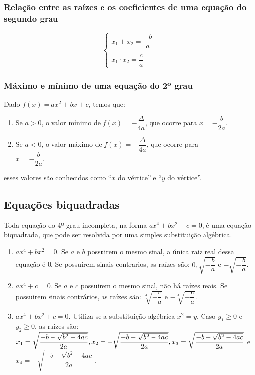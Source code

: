 \documentclass{article}
\begin{document}
\subsubsection{Relação entre as raízes e os coeficientes de uma equação do segundo grau}
\begin{equation*}
    \begin{cases}
        x_1+x_2=\dfrac{-b}{a}\\ \\
        x_1\cdot x_2=\dfrac{c}{a}
    \end{cases}
\end{equation*}

\subsubsection{Máximo e mínimo de uma equação do 2º grau}
Dado $f(x)=ax^2+bx+c$, temos que:
\begin{enumerate}
    \item Se $a>0$, o valor mínimo de $f(x)=-\dfrac{\Delta}{4a}$, que ocorre para $x=-\dfrac{b}{2a}$.
    \item Se $a<0$, o valor máximo de $f(x)=-\dfrac{\Delta}{4a}$, que ocorre para \\$x=-\dfrac{b}{2a}$.
\end{enumerate}
esses valores são conhecidos como ``$x$ do vértice'' e ``$y$ do vértice''.

\subsection{Equações biquadradas}
Toda equação do 4º grau incompleta, na forma $ax^4+bx^2+c=0$, é uma equação biquadrada, que pode ser resolvida por uma simples substituição algébrica.
\begin{enumerate}
        \item $ax^4+bx^2=0$. Se $a$ e $b$ possuirem o mesmo sinal, a única raiz real dessa equação é 0. Se possuirem sinais contrarios, as raízes são: $0, \sqrt{-\dfrac{b}{a}}$ e $-\sqrt{-\dfrac{b}{a}}$.
        \item $ax^4+c=0$. Se $a$ e $c$ possuirem o mesmo sinal, não há raízes reais. Se possuirem sinais contrários, as raízes são: $\sqrt[4]{-\dfrac{c}{a}}$ e $-\sqrt[4]{-\dfrac{c}{a}}$.
        \item $ax^4+bx^2+c=0$. Utiliza-se a substituição algébrica $x^2=y$. Caso $y_1\geq 0$ e $y_2\geq 0$, as raízes são: $x_1=\sqrt{\dfrac{-b-\sqrt{b^2-4ac}}{2a}}, x_2=-\sqrt{\dfrac{-b-\sqrt{b^2-4ac}}{2a}}, \\x_3=\sqrt{\dfrac{-b+\sqrt{b^2-4ac}}{2a}}$ e $x_4=-\sqrt{\dfrac{-b+\sqrt{b^2-4ac}}{2a}}$.
\end{enumerate}
\end{document}
